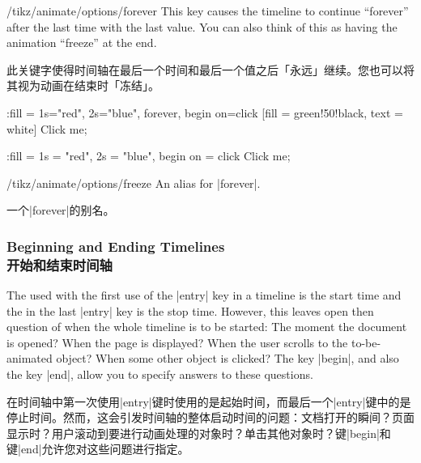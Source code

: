 \begin{key}{/tikz/animate/options/forever}
    This key causes the timeline to continue ``forever'' after the last time
    with the last value. You can also think of this as having the animation
    ``freeze'' at the end.
    
    此关键字使得时间轴在最后一个时间和最后一个值之后「永远」继续。您也可以将其视为动画在结束时「冻结」。


\begin{codeexample}[
    preamble={\usetikzlibrary{animations}},
    animation list = {0.5,1,1.5,2,2.5},
]
\tikz \node :fill = { 1s="red", 2s="blue", forever, begin on=click}
  [fill = green!50!black, text = white] {Click me};
\end{codeexample}
\begin{codeexample}[
    preamble={\usetikzlibrary{animations}},
    animation list = {0.5,1,1.5,2,2.5},
]
\tikz \node [fill = green!50!black, text = white]
    :fill = { 1s = "red", 2s = "blue", begin on = click }
  {Click me};
\end{codeexample}
\end{key}

\begin{key}{/tikz/animate/options/freeze}
    An alias for |forever|.

    一个|forever|的别名。
\end{key}


\subsubsection{Beginning and Ending Timelines\\开始和结束时间轴}
\label{section-anim-begin-end}

The  used with the first use of the |entry| key in a timeline is the
start time and the  in the last |entry| key is the stop time.
However, this leaves open then question of when the whole timeline is to be
started: The moment the document is opened? When the page is displayed? When
the user scrolls to the to-be-animated object? When some other object is
clicked? The key |begin|, and also the key |end|, allow you to specify answers
to these questions.

在时间轴中第一次使用|entry|键时使用的是起始时间，而最后一个|entry|键中的是停止时间。然而，这会引发时间轴的整体启动时间的问题：文档打开的瞬间？页面显示时？用户滚动到要进行动画处理的对象时？单击其他对象时？键|begin|和键|end|允许您对这些问题进行指定。


